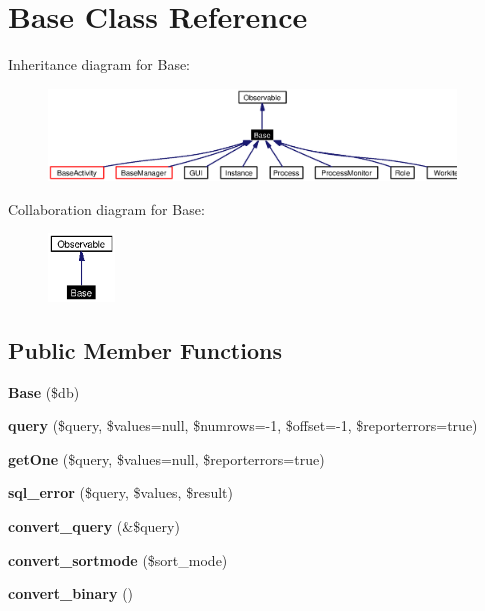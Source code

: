 \section{Base Class Reference}
\label{classBase}
Inheritance diagram for Base:\begin{figure}[H]
\begin{center}
\leavevmode
\includegraphics[width=307pt]{classBase__inherit__graph}
\end{center}
\end{figure}
Collaboration diagram for Base:\begin{figure}[H]
\begin{center}
\leavevmode
\includegraphics[width=50pt]{classBase__coll__graph}
\end{center}
\end{figure}
\subsection*{Public Member Functions}
\begin{CompactItemize}
\item 
{\bf Base} (\$db)\label{classBase_a0}

\item 
{\bf query} (\$query, \$values=null, \$numrows=-1, \$offset=-1, \$reporterrors=true)\label{classBase_a1}

\item 
{\bf get\-One} (\$query, \$values=null, \$reporterrors=true)\label{classBase_a2}

\item 
{\bf sql\_\-error} (\$query, \$values, \$result)\label{classBase_a3}

\item 
{\bf convert\_\-query} (\&\$query)\label{classBase_a4}

\item 
{\bf convert\_\-sortmode} (\$sort\_\-mode)\label{classBase_a5}

\item 
{\bf convert\_\-binary} ()\label{classBase_a6}

\end{CompactItemize}
